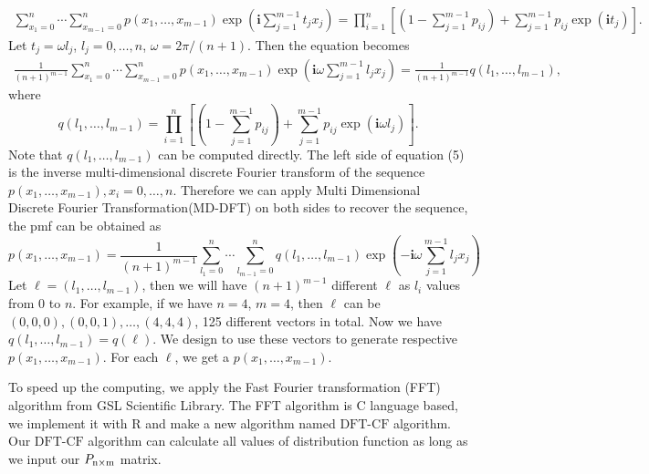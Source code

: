 \documentclass[12pt]{article}
\newcommand{\ivec}{{\boldsymbol{i}}}
\newcommand{\dft}{{\textrm{DFT-CF}}}
\begin{document}
\begin{align*}
\sum_{x_1 = 0}^{n}\cdots \sum_{x_{m-1} = 0}^n p(x_1,\ldots,x_{m-1})\exp\left(\ivec\sum_{j=1}^{m-1}t_jx_j\right)= \prod_{i=1}^{n}\left[(1 - \sum_{j=1}^{m-1}p_{ij})+\sum_{j=1}^{m-1}p_{ij}\exp(\ivec t_j)\right].
\end{align*}
Let $t_j = \omega l_j$, $l_j = 0, \ldots, n$, $\omega = 2\pi/(n+1)$. Then the equation becomes
\begin{align}
\frac{1}{(n+1)^{m-1}} \sum_{x_1 = 0}^{n}\cdots \sum_{x_{m-1} = 0}^n p(x_1,\ldots,x_{m-1}) \exp\left(\ivec\omega\sum_{j=1}^{m-1}l_j x_j\right)= \frac{1}{(n+1)^{m-1}} q(l_1, \ldots, l_{m-1}),
\end{align}
where
$$ q(l_1, \ldots, l_{m-1})=\prod_{i=1}^{n}\left[(1 - \sum_{j=1}^{m-1}p_{ij})+\sum_{j=1}^{m-1}p_{ij}\exp(\ivec \omega l_j)\right].$$	
Note that $q(l_1, \ldots, l_{m-1})$ can be computed directly. The left side of equation (5) is the inverse multi-dimensional discrete Fourier transform of the sequence $ p(x_1,\ldots,x_{m-1}), x_i = 0 , \dots, n$. Therefore we can apply Multi Dimensional Discrete Fourier Transformation(MD-DFT) on both sides to recover the sequence, the pmf can be obtained as
\begin{equation}
p(x_1, \ldots, x_{m-1}) = \frac{1}{(n+1)^{m-1}}\sum_{l_1 = 0}^{n}\cdots \sum_{l_{m-1} = 0}^n q(l_1, \ldots, l_{m-1}) \exp\left(-\ivec\omega\sum_{j=1}^{m-1}l_j x_j\right)
\end{equation}
Let $\ell = (l_1,\dots,l_{m-1})$, then we will have $(n
+1)^{m-1}$ different $\ell$ as $l_i$ values from $0$ to $n$. For example, if we have $n=4$, $m=4$, then $\ell$ can be $(0, 0, 0), (0, 0, 1), \dots, (4, 4, 4)$, 125 different vectors in total. Now we have $q(l_1,\dots,l_{m-1}) = q(\ell)$. We design to use these vectors to generate respective $p(x_1,\dots,x_{m-1})$. For each $\ell$, we get a $p(x_1,\dots,x_{m-1})$.

To speed up the computing, we apply the Fast Fourier transformation (FFT) algorithm  from GSL Scientific Library. The FFT algorithm is C language based, we implement it with R and make a new algorithm named $\dft$ algorithm. Our $\dft$ algorithm can calculate all values of distribution function as long as we input our $P_{\rm n \times m}$ matrix.



\end{document}
